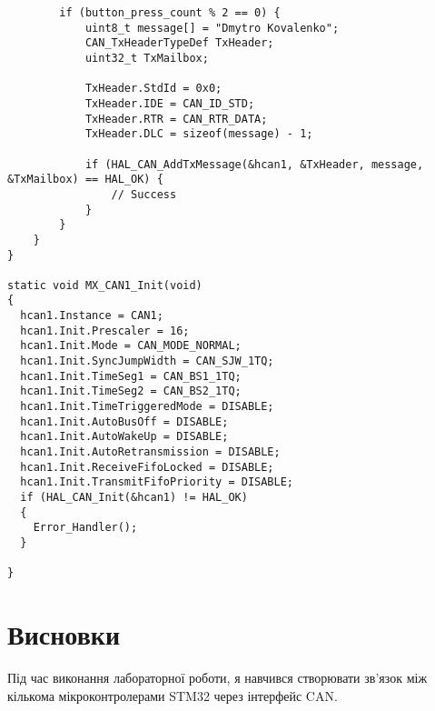 \documentclass[oneside,14pt]{extarticle}
\begin{document}
\begin{normalsize}
{\begin{lstlisting}
        if (button_press_count % 2 == 0) {
            uint8_t message[] = "Dmytro Kovalenko";
            CAN_TxHeaderTypeDef TxHeader;
            uint32_t TxMailbox;

            TxHeader.StdId = 0x0;
            TxHeader.IDE = CAN_ID_STD;
            TxHeader.RTR = CAN_RTR_DATA;
            TxHeader.DLC = sizeof(message) - 1;

            if (HAL_CAN_AddTxMessage(&hcan1, &TxHeader, message, &TxMailbox) == HAL_OK) {
                // Success
            }
        }
    }
}

static void MX_CAN1_Init(void)
{
  hcan1.Instance = CAN1;
  hcan1.Init.Prescaler = 16;
  hcan1.Init.Mode = CAN_MODE_NORMAL;
  hcan1.Init.SyncJumpWidth = CAN_SJW_1TQ;
  hcan1.Init.TimeSeg1 = CAN_BS1_1TQ;
  hcan1.Init.TimeSeg2 = CAN_BS2_1TQ;
  hcan1.Init.TimeTriggeredMode = DISABLE;
  hcan1.Init.AutoBusOff = DISABLE;
  hcan1.Init.AutoWakeUp = DISABLE;
  hcan1.Init.AutoRetransmission = DISABLE;
  hcan1.Init.ReceiveFifoLocked = DISABLE;
  hcan1.Init.TransmitFifoPriority = DISABLE;
  if (HAL_CAN_Init(&hcan1) != HAL_OK)
  {
    Error_Handler();
  }

}\end{lstlisting}}
	
	\section*{Висновки}
	Під час виконання лабораторної роботи, я навчився створювати зв'язок між кількома мікроконтролерами STM32 через інтерфейс CAN.
	    
\end{normalsize}
\end{document}
